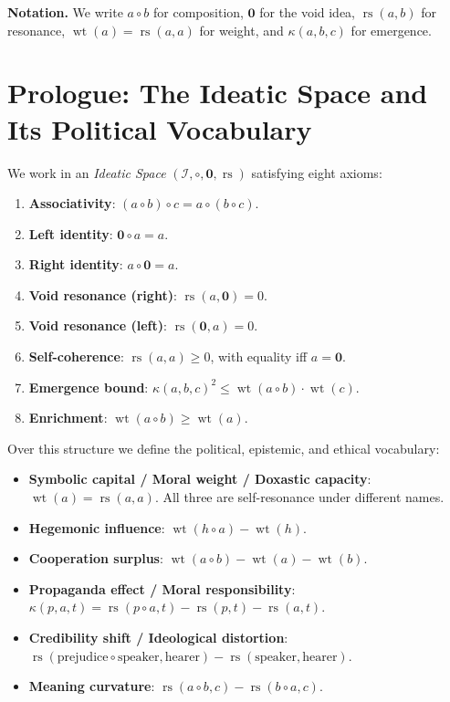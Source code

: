 \documentclass[11pt,openany]{book}
\theoremstyle{definition}
\theoremstyle{plain}
\theoremstyle{remark}
\newcommand{\IS}{\mathcal{I}}
\newcommand{\compose}{\circ}
\newcommand{\void}{\mathbf{0}}
\newcommand{\wt}{\operatorname{wt}}
\newcommand{\emrg}{\kappa}
\begin{document}
\bigskip

\noindent\textbf{Notation.}  We write $a \compose b$ for composition, $\void$ for the void idea, $\operatorname{rs}(a,b)$ for resonance, $\wt(a) = \operatorname{rs}(a,a)$ for weight, and $\emrg(a,b,c)$ for emergence.

\chapter*{Prologue: The Ideatic Space and Its Political Vocabulary}

We work in an \emph{Ideatic Space} $(\IS, \compose, \void, \operatorname{rs})$ satisfying eight axioms:

\begin{enumerate}
\item \textbf{Associativity}: $(a \compose b) \compose c = a \compose (b \compose c)$.
\item \textbf{Left identity}: $\void \compose a = a$.
\item \textbf{Right identity}: $a \compose \void = a$.
\item \textbf{Void resonance (right)}: $\operatorname{rs}(a, \void) = 0$.
\item \textbf{Void resonance (left)}: $\operatorname{rs}(\void, a) = 0$.
\item \textbf{Self-coherence}: $\operatorname{rs}(a, a) \geq 0$, with equality iff $a = \void$.
\item \textbf{Emergence bound}: $\emrg(a,b,c)^2 \leq \wt(a \compose b) \cdot \wt(c)$.
\item \textbf{Enrichment}: $\wt(a \compose b) \geq \wt(a)$.
\end{enumerate}

Over this structure we define the political, epistemic, and ethical vocabulary:

\begin{itemize}
\item \textbf{Symbolic capital / Moral weight / Doxastic capacity}: $\wt(a) = \operatorname{rs}(a,a)$.  All three are self-resonance under different names.
\item \textbf{Hegemonic influence}: $\wt(h \compose a) - \wt(h)$.
\item \textbf{Cooperation surplus}: $\wt(a \compose b) - \wt(a) - \wt(b)$.
\item \textbf{Propaganda effect / Moral responsibility}: $\emrg(p, a, t) = \operatorname{rs}(p \compose a, t) - \operatorname{rs}(p, t) - \operatorname{rs}(a, t)$.
\item \textbf{Credibility shift / Ideological distortion}: $\operatorname{rs}(\text{prejudice} \compose \text{speaker}, \text{hearer}) - \operatorname{rs}(\text{speaker}, \text{hearer})$.
\item \textbf{Meaning curvature}: $\operatorname{rs}(a \compose b, c) - \operatorname{rs}(b \compose a, c)$.
\end{itemize}
\end{document}
